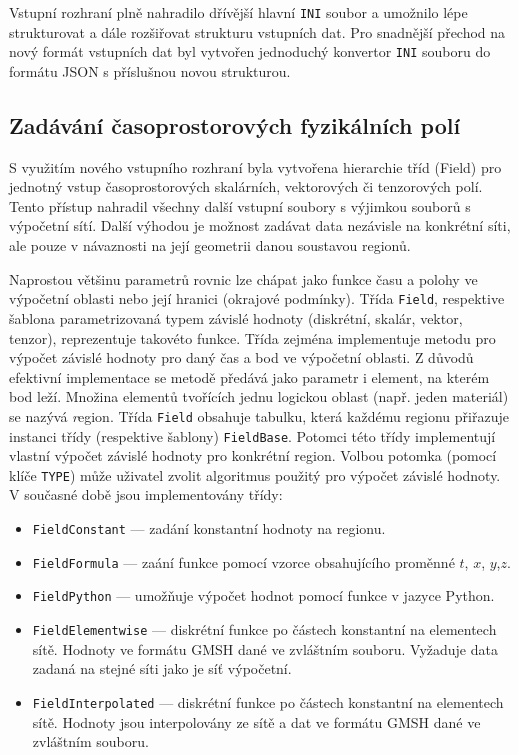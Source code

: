 \documentclass[11pt]{report}
\begin{document}
Vstupní rozhraní plně nahradilo dřívější hlavní \verb'INI' soubor a umožnilo 
lépe strukturovat a dále rozšiřovat strukturu vstupních dat. Pro snadnější 
přechod na nový formát vstupních dat byl vytvořen jednoduchý konvertor 
\verb'INI' souboru do formátu JSON s příslušnou novou strukturou.  

\subsection{Zadávání časoprostorových fyzikálních polí}
S využitím nového vstupního rozhraní byla vytvořena hierarchie tříd (Field) pro 
jednotný vstup časoprostorových skalárních, vektorových či 
tenzorových polí. Tento přístup nahradil všechny další vstupní soubory 
s výjimkou souborů s výpočetní sítí. Další výhodou je možnost zadávat data 
nezávisle na konkrétní síti, ale pouze v  návaznosti na její geometrii danou 
soustavou regionů.

Naprostou většinu parametrů rovnic lze chápat jako funkce času a polohy ve 
výpočetní oblasti nebo její hranici (okrajové podmínky).  Třída 
\verb'Field', respektive šablona parametrizovaná typem 
závislé hodnoty (diskrétní, skalár, vektor, tenzor), reprezentuje 
takovéto funkce. Třída zejména implementuje  metodu pro výpočet 
závislé hodnoty pro daný čas a bod ve výpočetní oblasti.
Z důvodů efektivní implementace se metodě předává jako parametr i 
element, na kterém bod leží. Množina elementů tvořících jednu logickou 
oblast (např. jeden materiál) se nazývá {\emph region}. Třída \verb'Field' 
obsahuje tabulku, která každému regionu přiřazuje instanci třídy (respektive 
šablony) \verb'FieldBase'. Potomci této třídy implementují vlastní výpočet 
závislé hodnoty pro konkrétní region. Volbou potomka (pomocí klíče 
\verb'TYPE') může uživatel zvolit algoritmus použitý pro výpočet závislé 
hodnoty. V současné době jsou implementovány třídy:
\begin{itemize}
 \item {\tt FieldConstant} 
 --- zadání konstantní hodnoty na regionu.
 \item {\tt FieldFormula} 
 --- zaání funkce pomocí vzorce obsahujícího proměnné 
 $t$, $x$, $y$,$z$.
 \item {\tt FieldPython} 
 --- umožňuje výpočet hodnot pomocí funkce v jazyce Python.
 \item {\tt FieldElementwise} 
 --- diskrétní funkce po částech konstantní na elementech sítě. Hodnoty 
ve formátu GMSH dané ve zvláštním souboru. Vyžaduje data zadaná na stejné síti 
jako je síť výpočetní. 

 \item {\tt FieldInterpolated}
 --- diskrétní funkce po částech konstantní na elementech sítě. Hodnoty 
jsou interpolovány ze sítě a dat ve formátu GMSH dané ve zvláštním souboru.
\end{itemize}
\end{document}
